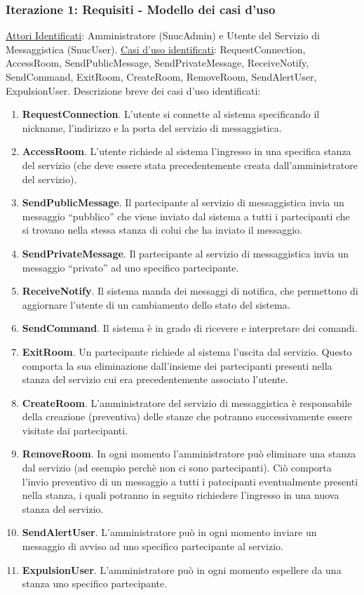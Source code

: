 \begin{frame} [allowframebreaks]
  \frametitle{Iterazione 1: Requisiti - Modello dei casi d'uso}
   \underline{Attori Identificati}: Amministratore (SnucAdmin) e Utente del Servizio di Messaggistica (SnucUser). \newline
   \underline{Casi d'uso identificati}: RequestConnection, AccessRoom, SendPublicMessage, SendPrivateMessage, ReceiveNotify, SendCommand, ExitRoom, CreateRoom, 
                                        RemoveRoom, SendAlertUser, ExpulsionUser. \newline
   Descrizione breve dei casi d'uso identificati:
   \begin{enumerate} 
    \item \textbf{RequestConnection}. L’utente si connette al sistema specificando il nickname, l’indirizzo e la porta del servizio di messaggistica.
    \item \textbf{AccessRoom}. L’utente richiede al sistema l’ingresso in una specifica stanza del servizio (che deve essere stata precedentemente creata 
          dall’amministratore del servizio). 
    \item \textbf{SendPublicMessage}. Il partecipante al servizio di messaggistica invia un messaggio ``pubblico'' che viene inviato dal sistema a tutti i 
          partecipanti che si trovano nella stessa stanza di colui che ha inviato il messaggio.
    \item \textbf{SendPrivateMessage}. Il partecipante al servizio di messaggistica  invia un messaggio ``privato'' ad uno specifico partecipante.
    \item \textbf{ReceiveNotify}. Il sistema manda dei messaggi di notifica, che permettono di aggiornare l’utente di un cambiamento dello stato del sistema.
    \item \textbf{SendCommand}. Il sistema è in grado di ricevere e interpretare dei comandi.
    \item \textbf{ExitRoom}. Un partecipante richiede al sistema l’uscita dal servizio. Questo comporta la sua eliminazione dall’insieme dei partecipanti presenti 
          nella stanza del servizio cui era precedentemente associato l’utente.
    \item \textbf{CreateRoom}. L’amministratore del servizio di messaggistica è responsabile della creazione (preventiva) delle stanze che potranno successivamente 
          essere visitate dai partecipanti.
    \item \textbf{RemoveRoom}. In ogni momento l’amministratore può eliminare una stanza dal servizio (ad esempio perchè non ci sono partecipanti). Ciò comporta 
          l’invio preventivo di un messaggio a tutti i patecipanti eventualmente presenti nella stanza, i quali potranno in seguito richiedere l’ingresso in una   
          nuova stanza del servizio.
    \item \textbf{SendAlertUser}. L’amministratore può in ogni momento inviare un messaggio di avviso ad uno specifico partecipante al servizio.
    \item \textbf{ExpulsionUser}. L’amministratore può in ogni momento espellere da una stanza uno specifico partecipante.  
   \end{enumerate}
\end{frame}

